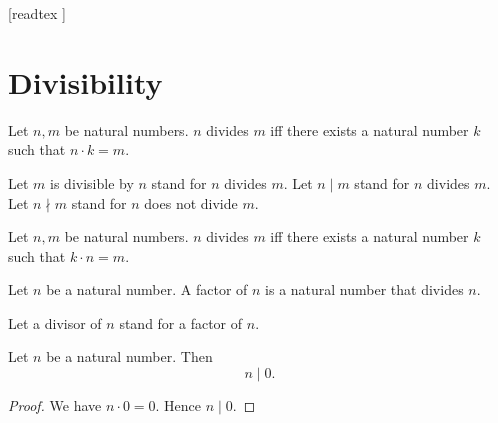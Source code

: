 \documentclass[10pt]{article}
\begin{document}
  \begin{imports}
    \begin{forthel}
      [readtex ]
    \end{forthel}
  \end{imports}


  \section{Divisibility}

  \begin{forthel}
    \begin{definition}
      Let $n, m$ be natural numbers.
      $n$ divides $m$ iff there exists a natural number $k$ such that
      $n \cdot k = m$.
    \end{definition}

    Let $m$ is divisible by $n$ stand for $n$ divides $m$.
    Let $n \mid m$ stand for $n$ divides $m$.
    Let $n \nmid m$ stand for $n$ does not divide $m$.
  \end{forthel}

  \begin{forthel}
    \begin{lemma}
      Let $n, m$ be natural numbers.
      $n$ divides $m$ iff there exists a natural number $k$ such that
      $k \cdot n = m$.
    \end{lemma}
  \end{forthel}

  \begin{forthel}
    \begin{definition}
      Let $n$ be a natural number.
      A factor of $n$ is a natural number that divides $n$.
    \end{definition}

    Let a divisor of $n$ stand for a factor of $n$.
  \end{forthel}

  \begin{forthel}
    \begin{proposition}
      Let $n$ be a natural number.
      Then \[ n \mid 0. \]
    \end{proposition}
    \begin{proof}
      We have $n \cdot 0 = 0$.
      Hence $n \mid 0$.
    \end{proof}
  \end{forthel}
\end{document}
